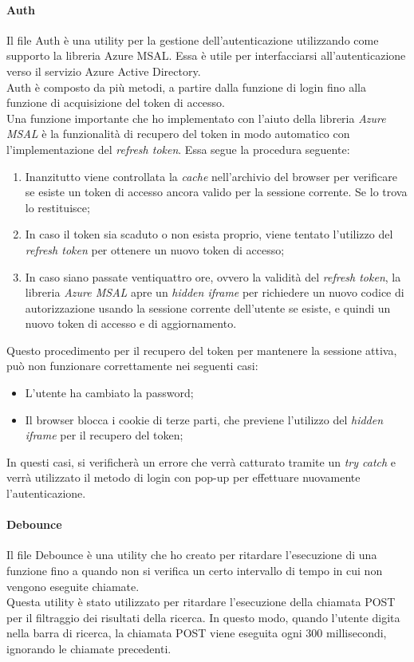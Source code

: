 \paragraph{Auth}\label{par:auth-utils}
Il file Auth è una utility per la gestione dell'autenticazione utilizzando come supporto la libreria Azure MSAL. Essa è utile
per interfacciarsi all'autenticazione verso il servizio Azure Active Directory.\\
Auth è composto da più metodi, a partire dalla funzione di login fino alla funzione di acquisizione del token di accesso.\\
Una funzione importante che ho implementato con l'aiuto della libreria \textit{Azure MSAL} è la funzionalità di recupero del token in modo automatico con 
l'implementazione del \textit{refresh token}. Essa segue la procedura seguente:
\begin{enumerate}
  \item Inanzitutto viene controllata la \textit{cache} nell'archivio del browser per verificare se esiste un token di accesso ancora valido per la sessione corrente. Se lo trova lo restituisce;
  \item In caso il token sia scaduto o non esista proprio, viene tentato l'utilizzo del \textit{refresh token} per ottenere un nuovo token di accesso;
  \item In caso siano passate ventiquattro ore, ovvero la validità del \textit{refresh token}, la libreria \textit{Azure MSAL} apre un \textit{hidden iframe} per richiedere
  un nuovo codice di autorizzazione usando la sessione corrente dell'utente se esiste, e quindi un nuovo token di accesso e di aggiornamento. 
\end{enumerate}
Questo procedimento per il recupero del token per mantenere la sessione attiva, può non funzionare correttamente nei seguenti casi:
\begin{itemize}
  \item L'utente ha cambiato la password;
  \item Il browser blocca i cookie di terze parti, che previene l'utilizzo del \textit{hidden iframe} per il recupero del token;
\end{itemize}
In questi casi, si verificherà un errore che verrà catturato tramite un \textit{try catch} e verrà utilizzato il metodo di login con pop-up per effettuare nuovamente l'autenticazione.
\paragraph{Debounce}\label{par:debounce}
Il file Debounce è una utility che ho creato per ritardare l'esecuzione di una funzione fino a quando non si verifica
un certo intervallo di tempo in cui non vengono eseguite chiamate.\\
Questa utility è stato utilizzato per ritardare l'esecuzione della chiamata POST per il filtraggio dei risultati della ricerca. 
In questo modo, quando l'utente digita nella barra di ricerca, la chiamata POST viene eseguita ogni 300 millisecondi, ignorando le chiamate precedenti.

